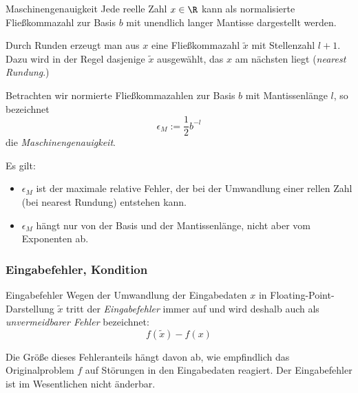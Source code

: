 \begin{defi}{Maschinengenauigkeit}
    Jede reelle Zahl $x \in \R$ kann als normalisierte Fließkommazahl zur Basis $b$ mit unendlich langer Mantisse dargestellt werden.

    Durch Runden erzeugt man aus $x$ eine Fließkommazahl $\tilde{x}$ mit Stellenzahl $l + 1$.
    Dazu wird in der Regel dasjenige $\tilde{x}$ ausgewählt, das $x$ am nächsten liegt (\emph{nearest Rundung}.)

    Betrachten wir normierte Fließkommazahlen zur Basis $b$ mit Mantissenlänge $l$, so bezeichnet
    \[
        \epsilon_M := \frac{1}{2} b^{-l}
    \]
    die \emph{Maschinengenauigkeit}.

    Es gilt:
    \begin{itemize}
        \item $\epsilon_M$ ist der maximale relative Fehler, der bei der Umwandlung einer rellen Zahl (bei nearest Rundung) entstehen kann.
        \item $\epsilon_M$ hängt nur von der Basis und der Mantissenlänge, nicht aber vom Exponenten ab.
    \end{itemize}
\end{defi}

\subsubsection{Eingabefehler, Kondition}

\begin{defi}{Eingabefehler}
    Wegen der Umwandlung der Eingabedaten $x$ in Floating-Point-Darstellung $\tilde{x}$ tritt der \emph{Eingabefehler} immer auf und wird deshalb auch als \emph{unvermeidbarer Fehler} bezeichnet:
    \[
        f(\tilde{x}) - f(x)
    \]

    Die Größe dieses Fehleranteils hängt davon ab, wie empfindlich das Originalproblem $f$ auf Störungen in den Eingabedaten reagiert.
    Der Eingabefehler ist im Wesentlichen nicht änderbar. 
\end{defi}

